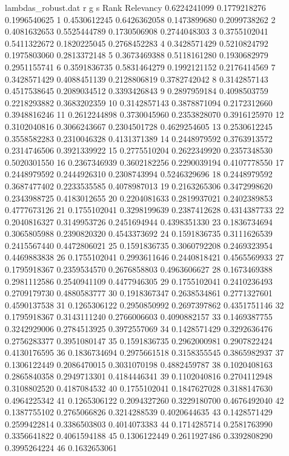 \begin{filecontents*}{lambdas_robust.dat}
r	g	s	Rank	Relevancy
0.6224241099	0.1779218276	0.1996540625	1	0.4530612245
0.6426362058	0.1473899680	0.2099738262	2	0.4081632653
0.5525444789	0.1730506908	0.2744048303	3	0.3755102041
0.5411322672	0.1820225045	0.2768452283	4	0.3428571429
0.5210824792	0.1975803060	0.2813372148	5	0.3673469388
0.5118161280	0.1930682979	0.2951155741	6	0.3591836735
0.5831464279	0.1992121152	0.2176414569	7	0.3428571429
0.4088451139	0.2128806819	0.3782742042	8	0.3142857143
0.4517538645	0.2089034512	0.3393426843	9	0.2897959184
0.4098503759	0.2218293882	0.3683202359	10	0.3142857143
0.3878871094	0.2172312660	0.3948816246	11	0.2612244898
0.3730045960	0.2353828070	0.3916125970	12	0.3102040816
0.3066243667	0.2304501728	0.4629254605	13	0.2530612245
0.3558582283	0.2310046328	0.4131371389	14	0.2448979592
0.3763913572	0.2314746506	0.3921339922	15	0.2775510204
0.2622349920	0.2357348530	0.5020301550	16	0.2367346939
0.3602182256	0.2290039194	0.4107778550	17	0.2448979592
0.2444926310	0.2308743994	0.5246329696	18	0.2448979592
0.3687477402	0.2233535585	0.4078987013	19	0.2163265306
0.3472998620	0.2343988725	0.4183012655	20	0.2204081633
0.2819937021	0.2402389853	0.4777673126	21	0.1755102041
0.3298199639	0.2387412628	0.4314387733	22	0.2040816327
0.3149953726	0.2451694944	0.4398351330	23	0.1836734694
0.3065805988	0.2390820320	0.4543373692	24	0.1591836735
0.3111626539	0.2415567440	0.4472806021	25	0.1591836735
0.3060792208	0.2469323954	0.4469883838	26	0.1755102041
0.2993611646	0.2440818421	0.4565569933	27	0.1795918367
0.2359534570	0.2676858803	0.4963606627	28	0.1673469388
0.2981112586	0.2540941109	0.4477946305	29	0.1755102041
0.2410236493	0.2709179730	0.4880583777	30	0.1918367347
0.2638534861	0.2771327601	0.4590137538	31	0.1265306122
0.2950850992	0.2697397862	0.4351751146	32	0.1795918367
0.3143111240	0.2766006603	0.4090882157	33	0.1469387755
0.3242929006	0.2784513925	0.3972557069	34	0.1428571429
0.3292636476	0.2756283377	0.3951080147	35	0.1591836735
0.2962000981	0.2907822424	0.4130176595	36	0.1836734694
0.2975661518	0.3158355545	0.3865982937	37	0.1306122449
0.2086470015	0.3031070198	0.4882459787	38	0.1020408163
0.2865840358	0.2949713301	0.4184446341	39	0.1102040816
0.2704112948	0.3108802520	0.4187084532	40	0.1755102041
0.1847627028	0.3188147630	0.4964225342	41	0.1265306122
0.2094327260	0.3229180700	0.4676492040	42	0.1387755102
0.2765066826	0.3214288539	0.4020644635	43	0.1428571429
0.2599422814	0.3386503803	0.4014073383	44	0.1714285714
0.2581763990	0.3356641822	0.4061594188	45	0.1306122449
0.2611927486	0.3392808290	0.3995264224	46	0.1632653061

\end{filecontents*}
